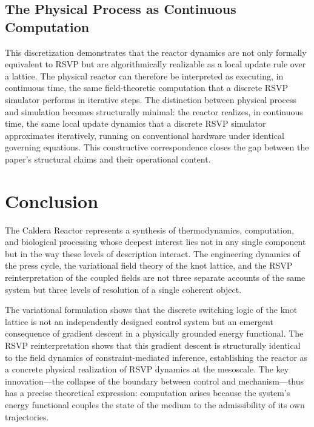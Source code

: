 \documentclass[12pt, a4paper]{article}
\begin{document}
\subsection{The Physical Process as Continuous Computation}

This discretization demonstrates that the reactor dynamics are not only formally equivalent to RSVP but are algorithmically realizable as a local update rule over a lattice. The physical reactor can therefore be interpreted as executing, in continuous time, the same field-theoretic computation that a discrete RSVP simulator performs in iterative steps. The distinction between physical process and simulation becomes structurally minimal: the reactor realizes, in continuous time, the same local update dynamics that a discrete RSVP simulator approximates iteratively, running on conventional hardware under identical governing equations. This constructive correspondence closes the gap between the paper's structural claims and their operational content.


\section{Conclusion}

The Caldera Reactor represents a synthesis of thermodynamics, computation, and biological processing whose deepest interest lies not in any single component but in the way these levels of description interact. The engineering dynamics of the press cycle, the variational field theory of the knot lattice, and the RSVP reinterpretation of the coupled fields are not three separate accounts of the same system but three levels of resolution of a single coherent object.

The variational formulation shows that the discrete switching logic of the knot lattice is not an independently designed control system but an emergent consequence of gradient descent in a physically grounded energy functional. The RSVP reinterpretation shows that this gradient descent is structurally identical to the field dynamics of constraint-mediated inference, establishing the reactor as a concrete physical realization of RSVP dynamics at the mesoscale. The key innovation—the collapse of the boundary between control and mechanism—thus has a precise theoretical expression: computation arises because the system's energy functional couples the state of the medium to the admissibility of its own trajectories.
\end{document}
